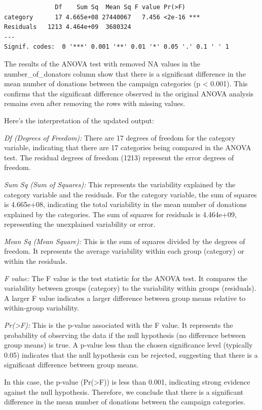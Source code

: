 \documentclass[
  letterpaper,
  DIV=11,
  numbers=noendperiod]{scrartcl}
\begin{document}
\begin{verbatim}
              Df    Sum Sq  Mean Sq F value Pr(>F)    
category      17 4.665e+08 27440067   7.456 <2e-16 ***
Residuals   1213 4.464e+09  3680324                   
---
Signif. codes:  0 '***' 0.001 '**' 0.01 '*' 0.05 '.' 0.1 ' ' 1
\end{verbatim}

The results of the ANOVA test with removed NA values in the
number\_of\_donators column show that there is a significant difference
in the mean number of donations between the campaign categories (p
\textless{} 0.001). This confirms that the significant difference
observed in the original ANOVA analysis remains even after removing the
rows with missing values.

Here's the interpretation of the updated output:

\emph{Df (Degrees of Freedom):} There are 17 degrees of freedom for the
category variable, indicating that there are 17 categories being
compared in the ANOVA test. The residual degrees of freedom (1213)
represent the error degrees of freedom.

\emph{Sum Sq (Sum of Squares):} This represents the variability
explained by the category variable and the residuals. For the category
variable, the sum of squares is 4.665e+08, indicating the total
variability in the mean number of donations explained by the categories.
The sum of squares for residuals is 4.464e+09, representing the
unexplained variability or error.

\emph{Mean Sq (Mean Square):} This is the sum of squares divided by the
degrees of freedom. It represents the average variability within each
group (category) or within the residuals.

\emph{F value:} The F value is the test statistic for the ANOVA test. It
compares the variability between groups (category) to the variability
within groups (residuals). A larger F value indicates a larger
difference between group means relative to within-group variability.

\emph{Pr(\textgreater F):} This is the p-value associated with the F
value. It represents the probability of observing the data if the null
hypothesis (no difference between group means) is true. A p-value less
than the chosen significance level (typically 0.05) indicates that the
null hypothesis can be rejected, suggesting that there is a significant
difference between group means.

In this case, the p-value (Pr(\textgreater F)) is less than 0.001,
indicating strong evidence against the null hypothesis. Therefore, we
conclude that there is a significant difference in the mean number of
donations between the campaign categories.
\end{document}
